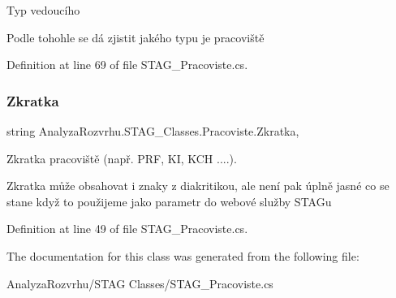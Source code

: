 Typ vedoucího 

Podle tohohle se dá zjistit jakého typu je pracoviště

Definition at line 69 of file S\+T\+A\+G\+\_\+\+Pracoviste.\+cs.

\mbox{\label{class_analyza_rozvrhu_1_1_s_t_a_g___classes_1_1_pracoviste_a76e26d6a2ae6a79c368e43822cfef762}} 
\subsubsection{\texorpdfstring{Zkratka}{Zkratka}}
{\footnotesize\ttfamily string Analyza\+Rozvrhu.\+S\+T\+A\+G\+\_\+\+Classes.\+Pracoviste.\+Zkratka\hspace{0.3cm}{\ttfamily [get]}, {\ttfamily [set]}}



Zkratka pracoviště (např. P\+RF, KI, K\+CH ....). 

Zkratka může obsahovat i znaky z diakritikou, ale není pak úplně jasné co se stane když to použijeme jako parametr do webové služby S\+T\+A\+Gu

Definition at line 49 of file S\+T\+A\+G\+\_\+\+Pracoviste.\+cs.



The documentation for this class was generated from the following file\+:\begin{DoxyCompactItemize}
\item 
Analyza\+Rozvrhu/\+S\+T\+A\+G Classes/S\+T\+A\+G\+\_\+\+Pracoviste.\+cs\end{DoxyCompactItemize}
